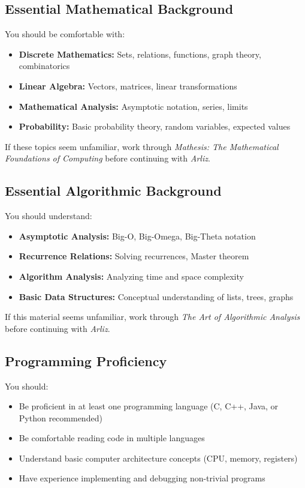 \subsection*{Essential Mathematical Background}

You should be comfortable with:

\begin{itemize}
    \item \textbf{Discrete Mathematics:} Sets, relations, functions, graph theory, combinatorics
    \item \textbf{Linear Algebra:} Vectors, matrices, linear transformations
    \item \textbf{Mathematical Analysis:} Asymptotic notation, series, limits
    \item \textbf{Probability:} Basic probability theory, random variables, expected values
\end{itemize}

If these topics seem unfamiliar, work through \textit{Mathesis: The Mathematical Foundations of Computing} before continuing with \textit{Arliz}.

\subsection*{Essential Algorithmic Background}

You should understand:

\begin{itemize}
    \item \textbf{Asymptotic Analysis:} Big-O, Big-Omega, Big-Theta notation
    \item \textbf{Recurrence Relations:} Solving recurrences, Master theorem
    \item \textbf{Algorithm Analysis:} Analyzing time and space complexity
    \item \textbf{Basic Data Structures:} Conceptual understanding of lists, trees, graphs
\end{itemize}

If this material seems unfamiliar, work through \textit{The Art of Algorithmic Analysis} before continuing with \textit{Arliz}.

\subsection*{Programming Proficiency}

You should:

\begin{itemize}
    \item Be proficient in at least one programming language (C, C++, Java, or Python recommended)
    \item Be comfortable reading code in multiple languages
    \item Understand basic computer architecture concepts (CPU, memory, registers)
    \item Have experience implementing and debugging non-trivial programs
\end{itemize}

